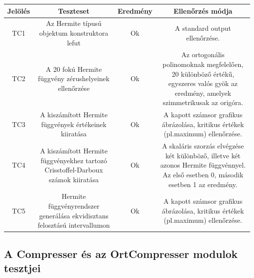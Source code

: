 \documentclass[oneside,titlepage,12pt,a4paper]{report}
\begin{document}
\begin{center}
\begin{adjustbox}{width=1\textwidth}
 \begin{tabular}{||c c c c||} 
 \hline
 Jelölés & Teszteset & Eredmény &  Ellenőrzés módja \\ [0.5ex] 
 \hline\hline
 TC1 & Az Hermite típusú objektum konstruktora lefut &  Ok & A standard output ellenőrzése. \\ 
 \hline
 TC2 & A 20 fokú Hermite függvény zérushelyeinek ellenőrzése &  Ok & Az ortogonális polinomoknak megfelelően, 20 különböző értékű, egyszeres valós gyök az eredmény, amelyek szimmetrikusak az origóra. \\
 \hline
 TC3 & A kiszámított Hermite függvények értékeinek kiiratása & Ok & A kapott számsor grafikus ábrázolása, kritikus értékek (pl.maximum) ellenőrzése. \\
 \hline
 TC4 & A kiszámított Hermite függvényekhez tartozó Crisstoffel-Darboux számok kiiratása & Ok & A skaláris szorzás elvégzése két különböző, illetve két azonos Hermite függvénnyel. Az első esetben 0, második esetben 1 az eredmény. \\
 \hline
  TC5 & Hermite függvényrendszer generálása ekvidisztans felosztású intervallumon & Ok &    A kapott számsor grafikus ábrázolása, kritikus értékek (pl.maximum) ellenőrzése. \\
 \hline
\end{tabular}
\end{adjustbox}
\end{center}

\subsection{A Compresser és az OrtCompresser modulok tesztjei}
\end{document}
